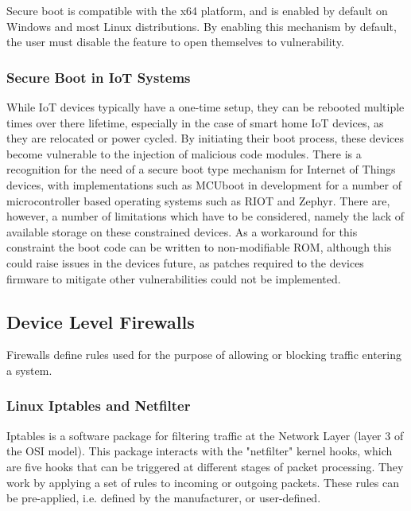Secure boot is compatible with the x64 platform, and is enabled by default on
Windows and most Linux distributions\cite{hoffman_2017}. By enabling this
mechanism by default, the user must disable the feature to open themselves to
vulnerability.

\subsubsection{Secure Boot in IoT Systems}

While IoT devices typically have a one-time setup, they can be rebooted multiple
times over there lifetime, especially in the case of smart home IoT devices, as
they are relocated or power cycled. By initiating their boot process, these
devices become vulnerable to the injection of malicious code modules. There is a
recognition for the need of a secure boot type mechanism for Internet of Things
devices, with implementations such as MCUboot in development for a number of
microcontroller based operating systems such as RIOT and
Zephyr\cite{juullabs-oss}. There are, however, a number of limitations which
have to be considered, namely the lack of available storage on these constrained
devices. As a workaround for this constraint the boot code can be written to
non-modifiable ROM, although this could raise issues in the devices future, as
patches required to the devices firmware to mitigate other vulnerabilities could
not be implemented\cite{iotSecurityFoundation}.

\subsection{Device Level Firewalls}

Firewalls define rules used for the purpose of allowing or blocking traffic
entering a system.

\subsubsection{Linux Iptables and Netfilter}

Iptables is a software package for filtering traffic at the Network Layer
(layer 3 of the OSI model). This package interacts with the "netfilter" kernel
hooks, which are five hooks that can be triggered at different stages of packet
processing. They work by applying a set of rules to incoming or outgoing packets.
These rules can be pre-applied, i.e. defined by the manufacturer, or user-defined.

